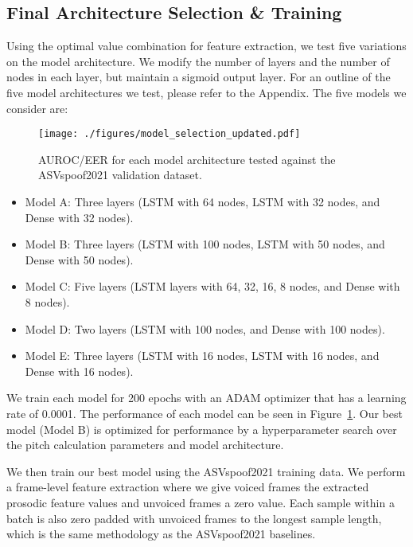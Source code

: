 \documentclass[10pt, journal, anonymous=true]{IEEEtran}
\begin{document}
\subsection{Final Architecture Selection \& Training}
Using the optimal value combination for feature extraction, we test five variations on the model architecture. We modify the number of layers and the number of nodes in each layer, but maintain a sigmoid output layer. For an outline of the five model architectures we test, please refer to the Appendix.
The five models we consider are:

\begin{figure}
    \begin{center}
    \texttt{[image: ./figures/model\_selection\_updated.pdf]}
    \caption{AUROC/EER for each model architecture tested against the
    ASVspoof2021 validation dataset.}
    \label{fig:model_selection}
    \end{center}
\end{figure}

\hfill
\begin{itemize}
    \item {Model A:} Three layers (LSTM with 64 nodes, LSTM with 32 nodes, and Dense with 32 nodes).
    \item {Model B:} Three layers (LSTM with 100 nodes, LSTM with 50 nodes, and Dense with 50 nodes).
    \item {Model C:} Five layers (LSTM layers with 64, 32, 16, 8 nodes, and Dense with 8 nodes).
    \item {Model D:} Two layers (LSTM with 100 nodes, and Dense with 100 nodes).
    \item {Model E:} Three layers (LSTM with 16 nodes, LSTM with 16 nodes, and Dense with 16 nodes).
\end{itemize}

\hfill

We train each model for 200 epochs with an ADAM optimizer that has a learning rate of 0.0001. The performance of each model can be seen in Figure~\ref{fig:model_selection}. Our best model (Model B) is optimized for performance by a hyperparameter search over the pitch calculation parameters and model architecture.

We then train our best model using the ASVspoof2021 training data. We perform a frame-level feature extraction where we give voiced frames the extracted prosodic feature values and unvoiced frames a zero value. Each sample within a batch is also zero padded with unvoiced frames to the longest sample length, which is the same methodology as the ASVspoof2021 baselines. 
\end{document}
